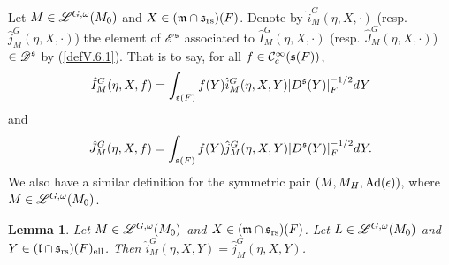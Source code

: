 \documentclass[a4paper]{amsart}
\newcommand{\mse}{\mathscr{E}}\newcommand{\msf}{\mathscr{F}}\newcommand{\msg}{\mathscr{G}}\newcommand{\msh}{\mathscr{H}}
\newcommand{\fm}{{\mathfrak{m}}} \newcommand{\fn}{{\mathfrak{n}}}\newcommand{\fo}{{\mathfrak{o}}} \newcommand{\fp}{{\mathfrak{p}}}
\newtheorem{lem}[thm]{Lemma}
\theoremstyle{definition}
\theoremstyle{remark}
\numberwithin{equation}{subsection}
\begin{document}
Let $M\in\mathscr{L}^{G,\omega}(M_0)$ and $X\in(\fm\cap\fs_\rs)(F)$. Denote by $\hat{i}_M^G(\eta, X, \cdot)$ (resp. $\hat{j}_M^G(\eta, X, \cdot)$) the element of $\mse^\fs$ associated to $\hat{I}_M^G(\eta, X, \cdot)$ (resp. $\hat{J}_M^G(\eta, X, \cdot)$) $\in\mathscr{D}^{\mathfrak{s}}$ by (\ref{defV.6.1}). That is to say, for all $f\in{\mathcal {C}}_c^\infty({\mathfrak{s}}(F))$, 
$$ \hat{I}_M^G(\eta, X, f)=\int_{{\mathfrak{s}}(F)} f(Y) \hat{i}_M^G(\eta, X, Y) |D^{\mathfrak{s}}(Y)|_F^{-1/2} dY $$
and
$$ \hat{J}_M^G(\eta, X, f)=\int_{{\mathfrak{s}}(F)} f(Y) \hat{j}_M^G(\eta, X, Y) |D^{\mathfrak{s}}(Y)|_F^{-1/2} dY. $$
We also have a similar definition for the symmetric pair $(M, M_H, {\mathrm{Ad}}(\epsilon))$, where $M\in\mathscr{L}^{G,\omega}(M_0)$. 

\begin{lem}\label{lemVI.2.1}
Let $M\in\mathscr{L}^{G,\omega}(M_0)$ and $X\in(\fm\cap\fs_\rs)(F)$. Let $L\in\mathscr{L}^{G,\omega}(M_0)$ and $Y\in({\mathfrak{l}}\cap{\mathfrak{s}}_{\mathrm{rs}})(F)_{\mathrm{ell}}$. Then $\hat{i}_M^G(\eta, X, Y)=\hat{j}_M^G(\eta, X, Y)$. 
\end{lem}
\end{document}
